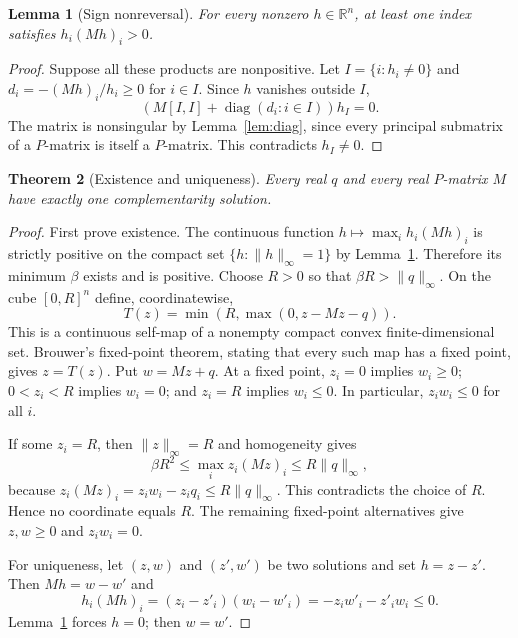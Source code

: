 \documentclass[11pt,a4paper]{article}
\newtheorem{theorem}{Theorem}[section]
\newtheorem{lemma}[theorem]{Lemma}
\theoremstyle{definition}\newtheorem{definition}[theorem]{Definition}
\theoremstyle{remark}\newtheorem{remark}[theorem]{Remark}
\newcommand{\R}{\mathbb R}\newcommand{\Q}{\mathbb Q}
\newcommand{\1}{\mathbf 1}
\begin{document}
\begin{lemma}[Sign nonreversal]\label{lem:sign}
For every nonzero $h\in\R^n$, at least one index satisfies $h_i(Mh)_i>0$.
\end{lemma}
\begin{proof}
Suppose all these products are nonpositive. Let $I=\{i:h_i\ne0\}$ and $d_i=-(Mh)_i/h_i\ge0$ for $i\in I$. Since $h$ vanishes outside $I$,
\[
 (M[I,I]+\operatorname{diag}(d_i:i\in I))h_I=0.
\]
The matrix is nonsingular by Lemma~\ref{lem:diag}, since every principal submatrix of a $P$-matrix is itself a $P$-matrix. This contradicts $h_I\ne0$.
\end{proof}

\begin{theorem}[Existence and uniqueness]\label{thm:exist}
Every real $q$ and every real $P$-matrix $M$ have exactly one complementarity solution.
\end{theorem}
\begin{proof}
First prove existence. The continuous function
$h\mapsto\max_i h_i(Mh)_i$ is strictly positive on the compact set $\{h:\|h\|_\infty=1\}$ by Lemma~\ref{lem:sign}. Therefore its minimum $\beta$ exists and is positive. Choose $R>0$ so that $\beta R>\|q\|_\infty$. On the cube $[0,R]^n$ define, coordinatewise,
\[
 T(z)=\min(R,\max(0,z-Mz-q)).
\]
This is a continuous self-map of a nonempty compact convex finite-dimensional set. Brouwer's fixed-point theorem, stating that every such map has a fixed point, gives $z=T(z)$. Put $w=Mz+q$.
At a fixed point, $z_i=0$ implies $w_i\ge0$; $0<z_i<R$ implies $w_i=0$; and $z_i=R$ implies $w_i\le0$. In particular, $z_iw_i\le0$ for all $i$.

If some $z_i=R$, then $\|z\|_\infty=R$ and homogeneity gives
\[
 \beta R^2\le\max_i z_i(Mz)_i
 \le R\|q\|_\infty,
\]
because $z_i(Mz)_i=z_iw_i-z_iq_i\le R\|q\|_\infty$. This contradicts the choice of $R$. Hence no coordinate equals $R$. The remaining fixed-point alternatives give $z,w\ge0$ and $z_iw_i=0$.

For uniqueness, let $(z,w)$ and $(z',w')$ be two solutions and set $h=z-z'$. Then $Mh=w-w'$ and
\[
 h_i(Mh)_i=(z_i-z'_i)(w_i-w'_i)
          =-z_iw'_i-z'_iw_i\le0.
\]
Lemma~\ref{lem:sign} forces $h=0$; then $w=w'$.
\end{proof}
\end{document}
